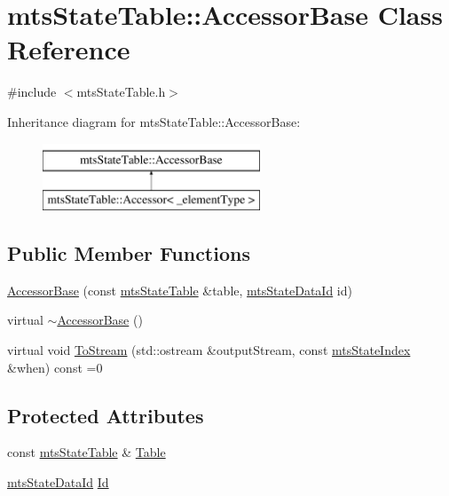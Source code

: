 \hypertarget{classmts_state_table_1_1_accessor_base}{}\section{mts\+State\+Table\+:\+:Accessor\+Base Class Reference}
\label{classmts_state_table_1_1_accessor_base}


{\ttfamily \#include $<$mts\+State\+Table.\+h$>$}

Inheritance diagram for mts\+State\+Table\+:\+:Accessor\+Base\+:\begin{figure}[H]
\begin{center}
\leavevmode
\includegraphics[height=2.000000cm]{da/d7f/classmts_state_table_1_1_accessor_base}
\end{center}
\end{figure}
\subsection*{Public Member Functions}
\begin{DoxyCompactItemize}
\item 
\hyperlink{classmts_state_table_1_1_accessor_base_adbc83cfe2eaaf91a3ff45d99be72d22f}{Accessor\+Base} (const \hyperlink{classmts_state_table}{mts\+State\+Table} \&table, \hyperlink{mts_state_table_8h_ac3a0e34e8991d51790b043fa01857a35}{mts\+State\+Data\+Id} id)
\item 
virtual \hyperlink{classmts_state_table_1_1_accessor_base_aeb87141f3b26f9e27b28a63603e326f9}{$\sim$\+Accessor\+Base} ()
\item 
virtual void \hyperlink{classmts_state_table_1_1_accessor_base_afe801a46c5a1982b1d03e36d3dd0f16d}{To\+Stream} (std\+::ostream \&output\+Stream, const \hyperlink{classmts_state_index}{mts\+State\+Index} \&when) const =0
\end{DoxyCompactItemize}
\subsection*{Protected Attributes}
\begin{DoxyCompactItemize}
\item 
const \hyperlink{classmts_state_table}{mts\+State\+Table} \& \hyperlink{classmts_state_table_1_1_accessor_base_a97d6abbfe4149895b84e07f6131ccd3d}{Table}
\item 
\hyperlink{mts_state_table_8h_ac3a0e34e8991d51790b043fa01857a35}{mts\+State\+Data\+Id} \hyperlink{classmts_state_table_1_1_accessor_base_af799080a0ce46c1243f9b19145d7ca31}{Id}
\end{DoxyCompactItemize}


